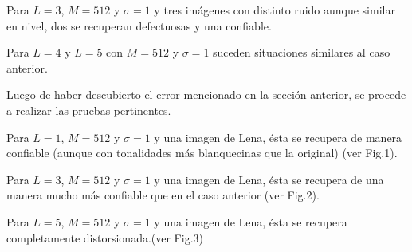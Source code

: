 \documentclass[10pt,journal,compsoc]{IEEEtran}
\begin{document}
Para $L = {3}$, $M = {512}$ y $\sigma = 1$ y tres im\'agenes con distinto ruido aunque similar en nivel, dos se recuperan defectuosas y una confiable.

Para $L = {4}$ y $L = {5}$ con $M = {512}$ y $\sigma = 1$ suceden situaciones similares al caso anterior.

Luego de haber descubierto el error mencionado en la secci\'on anterior, se procede a realizar las pruebas pertinentes.

Para $L = {1}$, $M = {512}$ y $\sigma = 1$ y una imagen de Lena, \'esta se recupera de manera confiable (aunque con tonalidades m\'as blanquecinas que la original) (ver Fig.1). 

Para $L = {3}$, $M = {512}$ y $\sigma = 1$ y una imagen de Lena, \'esta se recupera de una manera mucho m\'as confiable que en el caso anterior (ver Fig.2).

Para $L = {5}$, $M = {512}$ y $\sigma = 1$ y una imagen de Lena, \'esta se recupera completamente distorsionada.(ver Fig.3)\\
\end{document}
